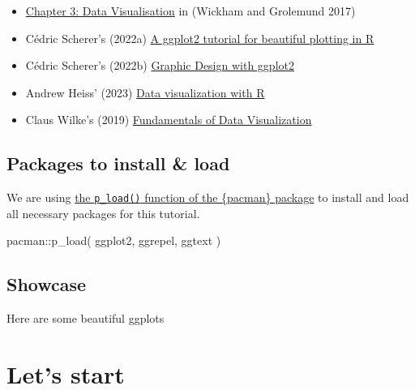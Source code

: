 \documentclass[
  letterpaper,
  DIV=11,
  numbers=noendperiod]{scrartcl}
\newenvironment{Shaded}{\begin{snugshade}}{\end{snugshade}}
\newcommand{\FunctionTok}[1]{\textcolor[rgb]{0.28,0.35,0.67}{#1}}
\newcommand{\NormalTok}[1]{\textcolor[rgb]{0.00,0.23,0.31}{#1}}
\newcommand{\SpecialCharTok}[1]{\textcolor[rgb]{0.37,0.37,0.37}{#1}}
\providecommand{\tightlist}{%
  \setlength{\itemsep}{0pt}\setlength{\parskip}{0pt}}\usepackage{longtable,booktabs,array}
\begin{document}
\begin{itemize}
\tightlist
\item
  \href{https://r4ds.had.co.nz/data-visualisation.html}{Chapter 3: Data
  Visualisation} in (Wickham and Grolemund 2017)
\item
  Cédric Scherer's (2022a)
  \href{https://www.cedricscherer.com/2019/08/05/a-ggplot2-tutorial-for-beautiful-plotting-in-r/}{A
  ggplot2 tutorial for beautiful plotting in R}
\item
  Cédric Scherer's (2022b)
  \href{https://rstudio-conf-2022.github.io/ggplot2-graphic-design/}{Graphic
  Design with ggplot2}
\item
  Andrew Heiss' (2023)
  \href{https://datavizs23.classes.andrewheiss.com/content/01-content.html}{Data
  visualization with R}
\item
  Claus Wilke's (2019)
  \href{https://clauswilke.com/dataviz/}{Fundamentals of Data
  Visualization}
\end{itemize}

\hypertarget{packages-to-install-load}{%
\subsection{Packages to install \&
load}\label{packages-to-install-load}}

We are using \href{../misc/usefulthings.html\#pacman}{the
\texttt{p\_load()} function of the \{pacman\} package} to install and
load all necessary packages for this tutorial.

\begin{Shaded}
\begin{Highlighting}[]
\NormalTok{pacman}\SpecialCharTok{::}\FunctionTok{p\_load}\NormalTok{(}
\NormalTok{  ggplot2,}
\NormalTok{  ggrepel,}
\NormalTok{  ggtext}
\NormalTok{  )}
\end{Highlighting}
\end{Shaded}

\hypertarget{showcase}{%
\subsection{Showcase}\label{showcase}}

Here are some beautiful ggplots

\hypertarget{lets-start}{%
\section{Let's start}\label{lets-start}}
\end{document}
